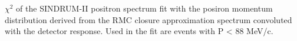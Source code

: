 \vspace{0.1in}
 {
  \label{fig:ana_step2_fit_kmax}
  $\chi^2$ of the SINDRUM-II positron spectrum fit with the posiron momentum distribution
  derived from the RMC closure approximation spectrum convoluted with the detector response. 
  Used in the fit are events with P < 88 MeV/c.
}
\vspace{0.1in}

